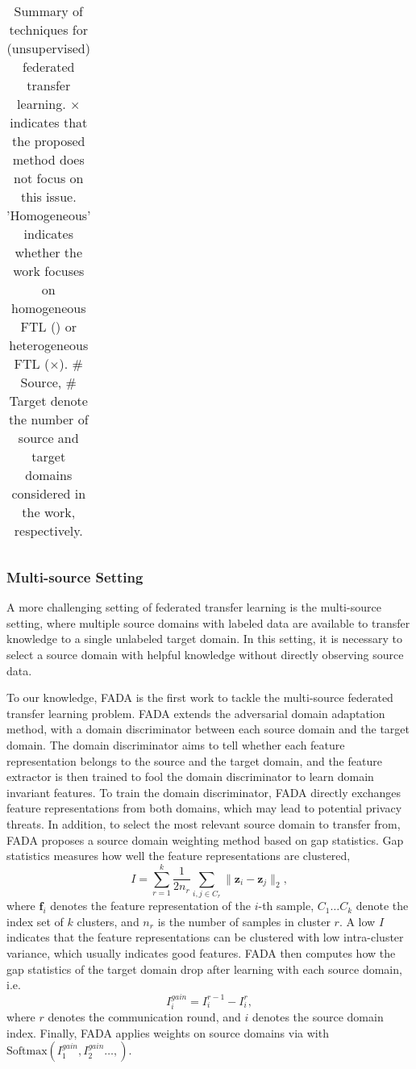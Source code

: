 \documentclass[11pt]{article}
\newcommand{\cmark}{\ding{51}}
\begin{document}
\begin{table}[t]
{\begin{tabular}{cccccccc}
    \bottomrule
    \end{tabular}}
    \caption{Summary of techniques for (unsupervised) federated transfer learning. $\times$ indicates that the proposed method does not focus on this issue. 'Homogeneous' indicates whether the work focuses on homogeneous FTL (\cmark) or heterogeneous FTL ($\times$). \# Source, \# Target denote the number of source and target domains considered in the work, respectively. }
    \label{tab:fed_utl}
\end{table}

\subsubsection{Multi-source Setting}
A more challenging setting of federated transfer learning is the multi-source setting, where multiple source domains with labeled data are available to transfer knowledge to a single unlabeled target domain. In this setting, it is necessary to select a source domain with helpful knowledge without directly observing source data.

To our knowledge, FADA \cite{Yilun-peng2020federated} is the first work to tackle the multi-source federated transfer learning problem. FADA extends the adversarial domain adaptation \cite{Yilun-ganin2016domain} method, with a domain discriminator between each source domain and the target domain. The domain discriminator aims to tell whether each feature representation belongs to the source and the target domain, and the feature extractor is then trained to fool the domain discriminator to learn domain invariant features. To train the domain discriminator, FADA directly exchanges feature representations from both domains, which may lead to potential privacy threats. In addition, to select the most relevant source domain to transfer from, FADA proposes a source domain weighting method based on gap statistics. Gap statistics \cite{Yilun-tibshirani2001estimating} measures how well the feature representations are clustered,
\begin{equation}
    I = \sum_{r=1}^k\frac{1}{2n_r}\sum_{i, j\in C_r}\|\mathbf{z}_i-\mathbf{z}_j\|_2,
\end{equation}
where $\mathbf{f}_i$ denotes the feature representation of the $i$-th sample, $C_1\dots C_k$ denote the index set of $k$ clusters, and $n_r$ is the number of samples in cluster $r$. A low $I$ indicates that the feature representations can be clustered with low intra-cluster variance, which usually indicates good features. FADA then computes how the gap statistics of the target domain drop after learning with each source domain, i.e.
\begin{equation}
    I_i^{gain} = I_i^{r-1}-I_i^{r},
\end{equation}
where $r$ denotes the communication round, and $i$ denotes the source domain index. Finally, FADA applies weights on source domains via with $\mathrm{Softmax}(I_1^{gain}, I_2^{gain}\dots, )$.
\end{document}
